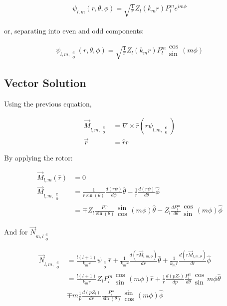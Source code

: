         \begin{align}
            \psi_{l,m}(r, \theta, \phi) = \sqrt{\frac{1}{\pi}}Z_l(k_m r)P_l^m e^{im\phi}
        \end{align}

        or, separating into even and odd components:

        \begin{align}
            \psi_{l,m,\substack{e\\ o}}(r, \theta, \phi) = \sqrt{\frac{1}{\pi}}Z_l(k_m r)P_l^m \substack{\cos\\\sin}(m\phi)
        \end{align}

    \subsection{Vector Solution}

        Using the previous equation,

        \begin{align}
            \vec{M}_{l,m, \substack{e \\ o}} &= \nabla \times \hat{r}(r \psi_{l, m, \substack{e \\ o }})\\
            \vec{r} &= \hat{r}r
        \end{align}

        By applying the rotor:

        \begin{align}
            \vec{M}_{l,m}(\hat{r}) &= 0 \\
            \vec{M}_{l,m, \substack{e \\ o}} &= \frac{1}{r\sin(\theta)}\frac{d(r\psi)}{d\phi}\hat{\theta} - \frac{1}{r}\frac{d(r\psi)}{d\theta}\hat{\phi} \\
            &= \mp Z_l\frac{P^m_l}{\sin(\theta)}\substack{\sin \\\cos}(m\phi)\hat{\theta} - Z_l\frac{dP^m_l}{d\theta}\substack{\cos \\ \sin}(m\phi)\hat{\phi}
        \end{align}

        And for $\vec{N}_{m,l\substack{e\\ o}}$

        \begin{align}
            \vec{N}_{l,m,\substack{e\\ o}} &= \frac{l(l+1)}{k_mr}\psi_{\substack{e\\ o}}\hat{r}
                + \frac{1}{k_mr}\frac{d(r\vec{M}_{l,m,\phi})}{dr} \hat{\theta} + \frac{1}{k_m r}\frac{d(r\vec{M}_{l,m,\theta})}{dr}\hat{\phi} \\
            &= \frac{l(l+1)}{k_mr}Z_l P_l^m \substack{\cos\\\sin}(m\phi) \hat{r}
                + \frac{1}{r}\frac{d(pZ_l)}{dp}\frac{P_l^m}{d\theta}\substack{\cos\\\sin}m\phi\hat{\theta}  \\
            &\mp m\frac{1}{p}\frac{d(pZ_l)}{dr}\frac{P_l^m}{\sin(\theta)}\substack{\sin\\\cos}(m\phi)\hat{\phi}
        \end{align}

